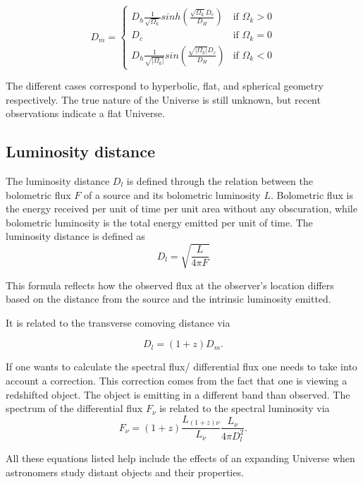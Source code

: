 $$
D_m =
\begin{cases}
  D_h\frac{1}{\sqrt{\Omega_k}}sinh(\frac{\sqrt{\Omega_k}D_c}{D_H}) & \text{if } \Omega_k > 0 \\
  D_c& \text{if } \Omega_k = 0 \\
  D_h\frac{1}{\sqrt{|\Omega_k|}}sin(\frac{\sqrt{|\Omega_k|}D_c}{D_H}) & \text{if } \Omega_k < 0
\end{cases}
$$

The different cases correspond to hyperbolic, flat, and spherical geometry respectively. The true nature 
of the Universe is still unknown, but recent observations indicate a flat Universe. 








\subsection{Luminosity distance}
The luminosity distance $D_l$ is defined through the relation between 
the bolometric flux $F$ of a source and its bolometric luminosity $L$. Bolometric flux is the energy received per unit of time per unit area without any obscuration, while bolometric luminosity is the total energy emitted per unit of time.
The luminosity distance is defined as
\begin{equation}    
    D_l = \sqrt{\frac{L}{4\pi F}}
\end{equation}

This formula reflects how the observed flux at the observer's location differs based on the distance from the source and the intrinsic luminosity emitted. 

It is related to the transverse comoving distance via 

\begin{equation}
    D_l = (1+z)D_m.
\end{equation}

If one wants to calculate the spectral 
flux/ differential flux one needs to take into account a correction. This correction comes 
from the fact that one is viewing a redshifted object. The object is emitting in a different band than 
observed. The spectrum of the differential flux $F_\nu$ is related to the spectral luminosity via
\begin{equation}
    F_\nu = (1+z) \frac{L_{(1+z)\nu}}{L_\nu}\frac{L_\nu}{4\pi D_l^2}.
\end{equation}


All these equations listed help include the effects of an expanding Universe when astronomers study distant objects and their properties.
